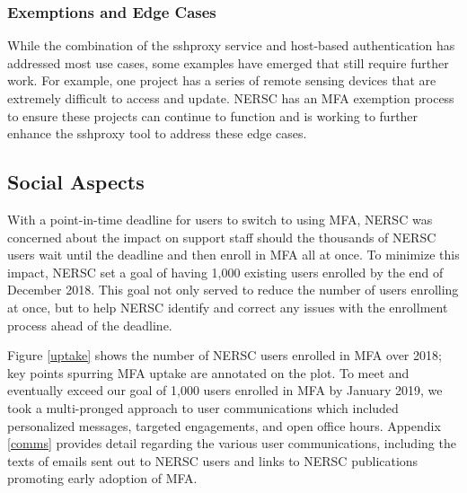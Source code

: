 \documentclass[sigconf,review]{acmart}
\begin{document}
\subsubsection{Exemptions and Edge Cases}
\label{edge}

While the combination of the sshproxy service and host-based authentication has
addressed most use cases, some examples have emerged that still require further
work.  For example, one project has a series of remote sensing devices that are
extremely difficult to access and update. NERSC has an MFA exemption
process to ensure these projects can continue to function and is working
to further enhance the sshproxy tool to address these edge cases.

\subsection{Social Aspects}
\label{social}

With a point-in-time deadline for users to switch to using MFA, NERSC was
concerned about the impact on support staff should the thousands of NERSC users
wait until the deadline and then enroll in MFA all at once. To minimize this
impact, NERSC set a goal of having 1,000 existing users enrolled by the end of
December 2018. This goal not only served to reduce the number of users enrolling
at once, but to help NERSC identify and correct any issues with the enrollment
process ahead of the deadline.

Figure \ref{uptake} shows the number of NERSC users enrolled in MFA over 2018;
key points spurring MFA uptake are annotated on the plot. To meet and eventually
exceed our goal of 1,000 users enrolled in MFA by January 2019, we took a
multi-pronged approach to user communications which included personalized messages,
targeted engagements, and open office hours. Appendix \ref{comms} provides
detail regarding the various user communications, including the texts of
emails sent out to NERSC users and links to NERSC publications promoting
early adoption of MFA.
\end{document}
